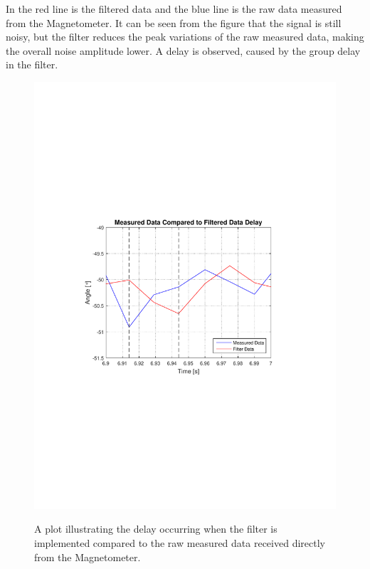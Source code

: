 In  the red line is the filtered data and the blue line is the raw data measured from the Magnetometer. It can be seen from the figure that the signal is still noisy, but the filter reduces the peak variations of the raw measured data, making the overall noise amplitude lower. A delay is observed, caused by the group delay in the filter.

\begin{figure}[H]
  \centering
  {
    \includegraphics[width=1.2\textwidth]{figures/FinalimplementationFilterDelay.pdf}
  }
  \caption{A plot illustrating the delay occurring when the filter is implemented compared to the raw measured data received directly from the Magnetometer.}
  \label{fig:FinalimplementationFilterDelay}
\end{figure}

